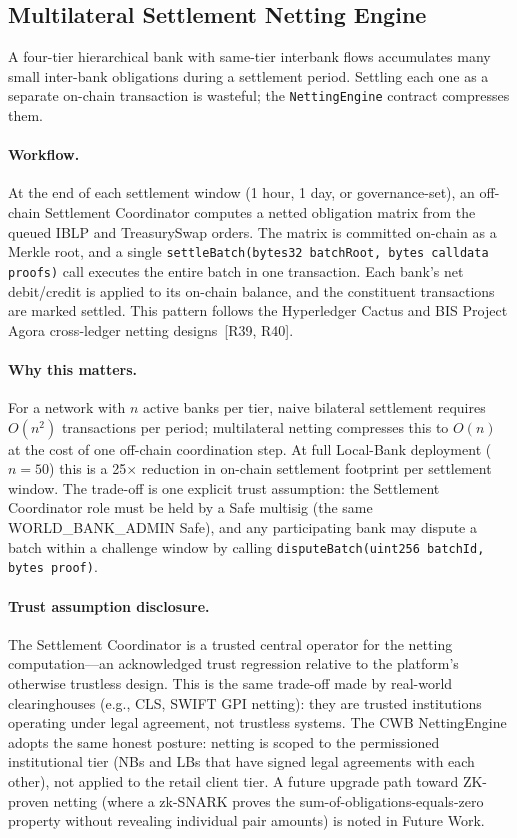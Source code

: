 \documentclass[12pt,a4paper]{report}
\begin{document}
\subsection{Multilateral Settlement Netting Engine}
\label{sec:netting-settlement}

A four-tier hierarchical bank with same-tier interbank flows accumulates many small inter-bank obligations during a settlement period. Settling each one as a separate on-chain transaction is wasteful; the \texttt{NettingEngine} contract compresses them.

\paragraph{Workflow.}
At the end of each settlement window (1 hour, 1 day, or governance-set), an off-chain Settlement Coordinator computes a netted obligation matrix from the queued IBLP and TreasurySwap orders. The matrix is committed on-chain as a Merkle root, and a single \texttt{settleBatch(bytes32 batchRoot, bytes calldata proofs)} call executes the entire batch in one transaction. Each bank's net debit/credit is applied to its on-chain balance, and the constituent transactions are marked settled. This pattern follows the Hyperledger Cactus and BIS Project Agora cross-ledger netting designs~[R39, R40].

\paragraph{Why this matters.}
For a network with $n$ active banks per tier, naive bilateral settlement requires $O(n^2)$ transactions per period; multilateral netting compresses this to $O(n)$ at the cost of one off-chain coordination step. At full Local-Bank deployment ($n = 50$) this is a 25$\times$ reduction in on-chain settlement footprint per settlement window. The trade-off is one explicit trust assumption: the Settlement Coordinator role must be held by a Safe multisig (the same WORLD\_BANK\_ADMIN Safe), and any participating bank may dispute a batch within a challenge window by calling \texttt{disputeBatch(uint256 batchId, bytes proof)}.

\paragraph{Trust assumption disclosure.}
The Settlement Coordinator is a trusted central operator for the netting computation---an acknowledged trust regression relative to the platform's otherwise trustless design. This is the same trade-off made by real-world clearinghouses (e.g., CLS, SWIFT GPI netting): they are trusted institutions operating under legal agreement, not trustless systems. The CWB NettingEngine adopts the same honest posture: netting is scoped to the permissioned institutional tier (NBs and LBs that have signed legal agreements with each other), not applied to the retail client tier. A future upgrade path toward ZK-proven netting (where a zk-SNARK proves the sum-of-obligations-equals-zero property without revealing individual pair amounts) is noted in Future Work.
\end{document}
